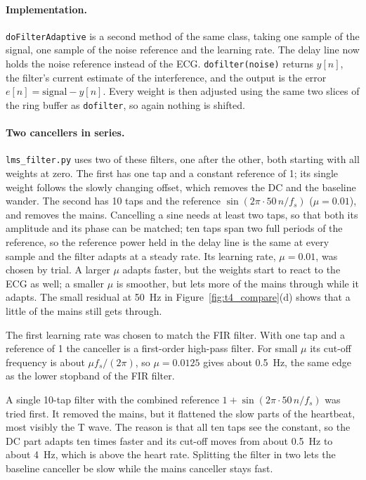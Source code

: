 \documentclass[11pt,a4paper]{article}
\newcommand{\fix}[1]{#1}
\begin{document}
\paragraph{Implementation.}
\texttt{doFilterAdaptive} is a second method of the same class, taking one sample of the signal, one sample of the noise reference and the learning rate.
The delay line now holds the noise reference instead of the ECG.
\texttt{dofilter(noise)} returns $y[n]$, the filter's current estimate of the interference, and the output is the error $e[n] = \mathrm{signal} - y[n]$.
Every weight is then adjusted using the same two slices of the ring buffer as \texttt{dofilter}, so again nothing is shifted.

\paragraph{Two cancellers in series.}
\texttt{lms\_filter.py} uses two of these filters, one after the other, both starting with all weights at zero.
The first has one tap and a constant reference of 1; its single weight follows the slowly changing offset, which removes the DC and the baseline wander.
The second has 10 taps and the reference $\sin(2\pi \cdot 50\,n/f_s)$ ($\mu = 0.01$), and removes the mains.
Cancelling a sine needs at least two taps, so that both its amplitude and its phase can be matched; ten taps span two full periods of the reference, so the reference power held in the delay line is the same at every sample and the filter adapts at a steady rate.
\fix{Its learning rate, $\mu = 0.01$, was chosen by trial.
A larger $\mu$ adapts faster, but the weights start to react to the ECG as well; a smaller $\mu$ is smoother, but lets more of the mains through while it adapts.
The small residual at \SI{50}{\hertz} in Figure~\ref{fig:t4_compare}(d) shows that a little of the mains still gets through.}

The first learning rate was chosen to match the FIR filter.
With one tap and a reference of 1 the canceller is a first-order high-pass filter. For small $\mu$ its cut-off frequency is about $\mu f_s/(2\pi)$, so $\mu = 0.0125$ gives about \SI{0.5}{\hertz}, the same edge as the lower stopband of the FIR filter.

A single 10-tap filter with the combined reference $1 + \sin(2\pi \cdot 50\,n/f_s)$ was tried first.
It removed the mains, but it flattened the slow parts of the heartbeat, most visibly the T wave.
The reason is that all ten taps see the constant, so the DC part adapts ten times faster and its cut-off moves from about \SI{0.5}{\hertz} to about \SI{4}{\hertz}, which is above the heart rate.
Splitting the filter in two lets the baseline canceller be slow while the mains canceller stays fast.
\end{document}
